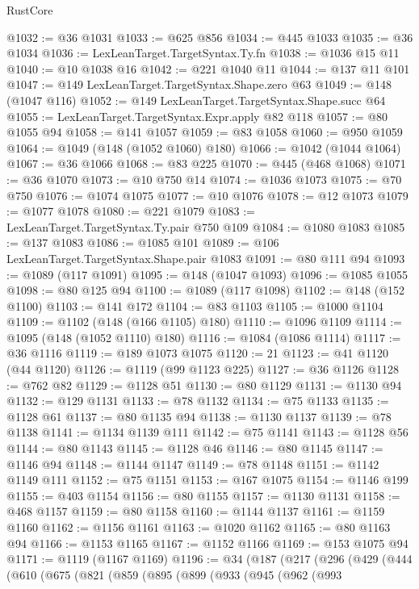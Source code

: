 \begin{lexlean}{RustCore}
\begin{coremodule}
@1032 := @36 @1031
@1033 := @625 @856
@1034 := @445 @1033
@1035 := @36 @1034
@1036 := LexLeanTarget.TargetSyntax.Ty.fn
@1038 := @1036 @15 @11
@1040 := @10 @1038 @16
@1042 := @221 @1040 @11
@1044 := @137 @11 @101
@1047 := @149 LexLeanTarget.TargetSyntax.Shape.zero @63
@1049 := @148 (@1047 @116)
@1052 := @149 LexLeanTarget.TargetSyntax.Shape.succ @64
@1055 := LexLeanTarget.TargetSyntax.Expr.apply @82 @118
@1057 := @80 @1055 @94
@1058 := @141 @1057
@1059 := @83 @1058
@1060 := @950 @1059
@1064 := @1049 (@148 (@1052 @1060) @180)
@1066 := @1042 (@1044 @1064)
@1067 := @36 @1066
@1068 := @83 @225
@1070 := @445 (@468 @1068)
@1071 := @36 @1070
@1073 := @10 @750 @14
@1074 := @1036 @1073
@1075 := @70 @750
@1076 := @1074 @1075
@1077 := @10 @1076
@1078 := @12 @1073
@1079 := @1077 @1078
@1080 := @221 @1079
@1083 := LexLeanTarget.TargetSyntax.Ty.pair @750 @109
@1084 := @1080 @1083
@1085 := @137 @1083
@1086 := @1085 @101
@1089 := @106 LexLeanTarget.TargetSyntax.Shape.pair @1083
@1091 := @80 @111 @94
@1093 := @1089 (@117 @1091)
@1095 := @148 (@1047 @1093)
@1096 := @1085 @1055
@1098 := @80 @125 @94
@1100 := @1089 (@117 @1098)
@1102 := @148 (@152 @1100)
@1103 := @141 @172
@1104 := @83 @1103
@1105 := @1000 @1104
@1109 := @1102 (@148 (@166 @1105) @180)
@1110 := @1096 @1109
@1114 := @1095 (@148 (@1052 @1110) @180)
@1116 := @1084 (@1086 @1114)
@1117 := @36 @1116
@1119 := @189 @1073 @1075
@1120 := 21
@1123 := @41 @1120 (@44 @1120)
@1126 := @1119 (@99 @1123 @225)
@1127 := @36 @1126
@1128 := @762 @82
@1129 := @1128 @51
@1130 := @80 @1129
@1131 := @1130 @94
@1132 := @129 @1131
@1133 := @78 @1132
@1134 := @75 @1133
@1135 := @1128 @61
@1137 := @80 @1135 @94
@1138 := @1130 @1137
@1139 := @78 @1138
@1141 := @1134 @1139 @111
@1142 := @75 @1141
@1143 := @1128 @56
@1144 := @80 @1143
@1145 := @1128 @46
@1146 := @80 @1145
@1147 := @1146 @94
@1148 := @1144 @1147
@1149 := @78 @1148
@1151 := @1142 @1149 @111
@1152 := @75 @1151
@1153 := @167 @1075
@1154 := @1146 @199
@1155 := @403 @1154
@1156 := @80 @1155
@1157 := @1130 @1131
@1158 := @468 @1157
@1159 := @80 @1158
@1160 := @1144 @1137
@1161 := @1159 @1160
@1162 := @1156 @1161
@1163 := @1020 @1162
@1165 := @80 @1163 @94
@1166 := @1153 @1165
@1167 := @1152 @1166
@1169 := @153 @1075 @94
@1171 := @1119 (@1167 @1169)
@1196 := @34
    (@187
      (@217
        (@296
          (@429
            (@444
              (@610
                (@675
                  (@821
                    (@859
                      (@895
                        (@899
                          (@933
                            (@945
                              (@962
                                (@993

\end{coremodule}
\end{lexlean}

